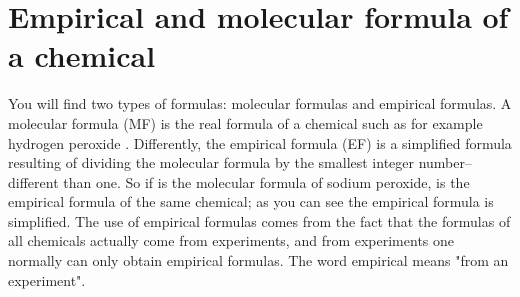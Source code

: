 \documentclass[main.tex]{subfiles}
\begin{document}
\section{Empirical and molecular formula of a chemical}
You will find two types of formulas: molecular formulas and empirical formulas. A molecular formula (MF) is the real formula of a chemical such as for example hydrogen peroxide . Differently, the empirical formula (EF) is a simplified formula resulting of dividing the molecular formula by the smallest integer number--different than one. So if  is the molecular formula of sodium peroxide,  is the empirical formula of the same chemical; as you can see the empirical formula is simplified. The use of empirical formulas comes from the fact that the formulas of all chemicals actually come from experiments, and from experiments one normally can only obtain empirical formulas. The word empirical means "from an experiment".
\sloppy
\end{document}
